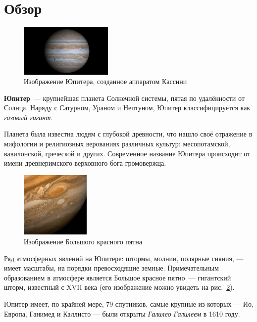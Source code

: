 \documentclass{article}
\begin{document}
	\section{Обзор}
	\begin{figure}	
		\vspace{-1pc}	
		\includegraphics[width = 0.4\textwidth]{img/Jupiter}		
		\caption{Изображение Юпитера, созданное аппаратом Кассини}
		\label{pic:Jupiter}
	\end{figure}
	
    \textbf{Юпитер}~--- крупнейшая планета Солнечной системы, пятая по удалённости от Солнца. Наряду с
    Сатурном, Ураном и Нептуном, Юпитер классифицируется как \textit{газовый гигант}.
    
	Планета была известна людям с глубокой древности, что нашло своё отражение в мифологии и религиозных
	верованиях различных культур: месопотамской, вавилонской, греческой и других. Современное название
	Юпитера происходит от имени древнеримского верховного бога-громовержца.
	
	\begin{figure}
		\includegraphics[width = 0.3\textwidth]{img/grs}
		\caption{Изображение Большого красного пятна}
		\label{pic:grs}
		\vspace{-1pc}
	\end{figure}	
	Ряд атмосферных явлений на Юпитере: штормы, молнии, полярные сияния, — имеет масштабы, на порядки
	превосходящие земные. Примечательным образованием в атмосфере является Большое красное пятно~---
	гигантский шторм, известный с XVII века (его изображение можно увидеть на рис.~\ref{pic:grs}).
	
	Юпитер имеет, по крайней мере, 79 спутников, самые крупные из которых — Ио, Европа, Ганимед и
	Каллисто — были открыты \textit{Галилео Галилеем} в 1610 году.
\end{document}
